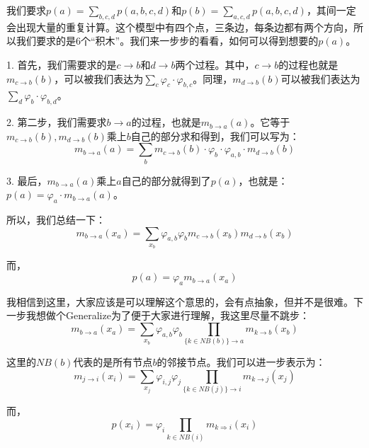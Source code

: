 \documentclass[a4paper]{article}
\begin{document}
我们要求$p(a) = \sum_{b,c,d}p(a,b,c,d)$和$p(b) = \sum_{a,c,d}p(a,b,c,d)$，其间一定会出现大量的重复计算。这个模型中有四个点，三条边，每条边都有两个方向，所以我们要求的是6个“积木”。我们来一步步的看看，如何可以得到想要的$p(a)$。

1. 首先，我们需要求的是$c\longrightarrow b$和$d \longrightarrow b$两个过程。其中，$c\longrightarrow b$的过程也就是$m_{c\longrightarrow b}(b)$，可以被我们表达为$\sum_c \varphi_c\cdot \varphi_{b,c}$。同理，$m_{d\longrightarrow b}(b)$可以被我们表达为$\sum_d \varphi_b\cdot \varphi_{b,d}$。

2. 第二步，我们需要求$b\longrightarrow a$的过程，也就是$m_{b\longrightarrow a}(a)$。它等于$m_{c\longrightarrow b}(b),m_{d\longrightarrow b}(b)$乘上$b$自己的部分求和得到，我们可以写为：
\begin{equation}
    m_{b\longrightarrow a}(a) = \sum_b m_{c\longrightarrow b}(b)\cdot \varphi_b\cdot\varphi_{a,b}\cdot m_{d\longrightarrow b}(b)
\end{equation}

3. 最后，$m_{b\longrightarrow a}(a)$乘上$a$自己的部分就得到了$p(a)$，也就是：$p(a) = \varphi_a \cdot m_{b\longrightarrow a}(a)$。

所以，我们总结一下：
\begin{equation}
    m_{b\longrightarrow a}(x_a) = \sum_{x_b} \varphi_{a,b}\varphi_bm_{c\longrightarrow b}(x_b)m_{d\longrightarrow b}(x_b)
\end{equation}

而，
\begin{equation}
    p(a) = \varphi_a m_{b \longrightarrow a}(x_a)
\end{equation}

我相信到这里，大家应该是可以理解这个意思的，会有点抽象，但并不是很难。下一步我想做个Generalize为了便于大家进行理解，我这里尽量不跳步：
\begin{equation}
    m_{b\longrightarrow a}(x_a) = \sum_{x_b} \varphi_{a,b}\varphi_b \prod_{\{k \in NB(b)\}\longrightarrow a } m_{k\longrightarrow b}(x_b)
\end{equation}

这里的$NB(b)$代表的是所有节点$b$的邻接节点。我们可以进一步表示为：
\begin{equation}
    m_{j\longrightarrow i}(x_i) = \sum_{x_j} \varphi_{i,j}\varphi_j \prod_{\{k \in NB(j)\}\longrightarrow i } m_{k\longrightarrow j}(x_j)
\end{equation}

而，
\begin{equation}
    p(x_i) = \varphi_i \prod_{k\in NB(i)} m_{k\Longrightarrow i}(x_i)
\end{equation}
\end{document}
